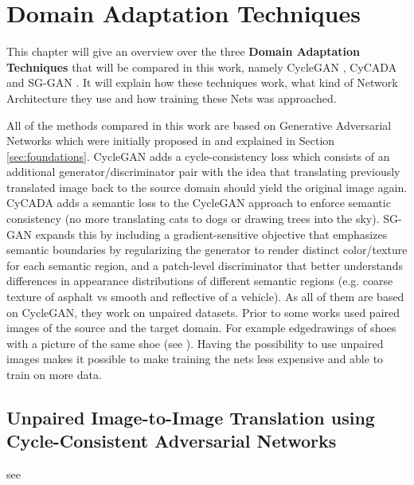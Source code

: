 \chapter{Domain Adaptation Techniques}
\label{sec:techniques}

This chapter will give an overview over the three \textbf{Domain Adaptation Techniques} that will be compared in this work, namely CycleGAN \cite{DBLP:journals/corr/ZhuPIE17}, CyCADA \cite{DBLP:journals/corr/abs-1711-03213} and SG-GAN \cite{DBLP:journals/corr/abs-1801-01726}. It will explain how these techniques work, what kind of Network Architecture they use and how training these Nets was approached.

All of the methods compared in this work are based on Generative Adversarial Networks which were initially proposed in \cite{NIPS2014_5423} and explained in Section \ref{sec:foundations}. CycleGAN \cite{DBLP:journals/corr/ZhuPIE17} adds a cycle-consistency loss which consists of an additional generator/discriminator pair with the idea that translating previously translated image back to the source domain should yield the original image again. CyCADA \cite{DBLP:journals/corr/abs-1711-03213} adds a semantic loss to the CycleGAN approach to enforce semantic consistency (no more translating cats to dogs or drawing trees into the sky). SG-GAN \cite{DBLP:journals/corr/abs-1801-01726} expands this by including a gradient-sensitive objective that emphasizes semantic boundaries by regularizing the generator to render distinct color/texture for each semantic region, and a patch-level discriminator that better understands differences in appearance distributions of different semantic regions (e.g. coarse texture of asphalt vs smooth and reflective of a vehicle). As all of them are based on CycleGAN, they work on unpaired datasets. Prior to \cite{DBLP:journals/corr/ZhuPIE17} some works used paired images of the source and the target domain. For example edgedrawings of shoes with a picture of the same shoe (see \cite{DBLP:journals/corr/IsolaZZE16}). Having the possibility to use unpaired images makes it possible to make training the nets less expensive and able to train on more data.


\section{Unpaired Image-to-Image Translation using Cycle-Consistent Adversarial Networks}
see \cite{DBLP:journals/corr/ZhuPIE17}

